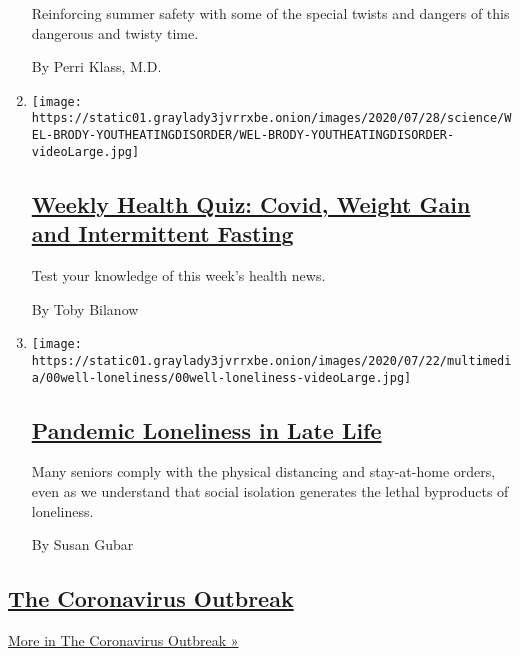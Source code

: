 \begin{enumerate}
  Reinforcing summer safety with some of the special twists and dangers
  of this dangerous and twisty time.

  By Perri Klass, M.D.
\item
  \texttt{[image: https://static01.graylady3jvrrxbe.onion/images/2020/07/28/science/WEL-BRODY-YOUTHEATINGDISORDER/WEL-BRODY-YOUTHEATINGDISORDER-videoLarge.jpg]}

  \hypertarget{weekly-health-quiz-covid-weight-gain-and-intermittent-fasting}{%
  \subsection{\texorpdfstring{\href{/interactive/2020/07/31/well/live/31healthquiz-07312020.html}{Weekly
  Health Quiz: Covid, Weight Gain and Intermittent
  Fasting}}{Weekly Health Quiz: Covid, Weight Gain and Intermittent Fasting}}\label{weekly-health-quiz-covid-weight-gain-and-intermittent-fasting}}

  Test your knowledge of this week's health news.

  By Toby Bilanow
\item
  \texttt{[image: https://static01.graylady3jvrrxbe.onion/images/2020/07/22/multimedia/00well-loneliness/00well-loneliness-videoLarge.jpg]}

  \hypertarget{pandemic-loneliness-in-late-life}{%
  \subsection{\texorpdfstring{\href{/2020/07/30/well/mind/pandemic-loneliness-in-late-life.html}{Pandemic
  Loneliness in Late
  Life}}{Pandemic Loneliness in Late Life}}\label{pandemic-loneliness-in-late-life}}

  Many seniors comply with the physical distancing and stay-at-home
  orders, even as we understand that social isolation generates the
  lethal byproducts of loneliness.

  By Susan Gubar
\end{enumerate}

\hypertarget{the-coronavirus-outbreak}{%
\subsection{\texorpdfstring{\href{/news-event/coronavirus}{The
Coronavirus
Outbreak}}{The Coronavirus Outbreak}}\label{the-coronavirus-outbreak}}

\href{/news-event/coronavirus}{More in The Coronavirus Outbreak »}

